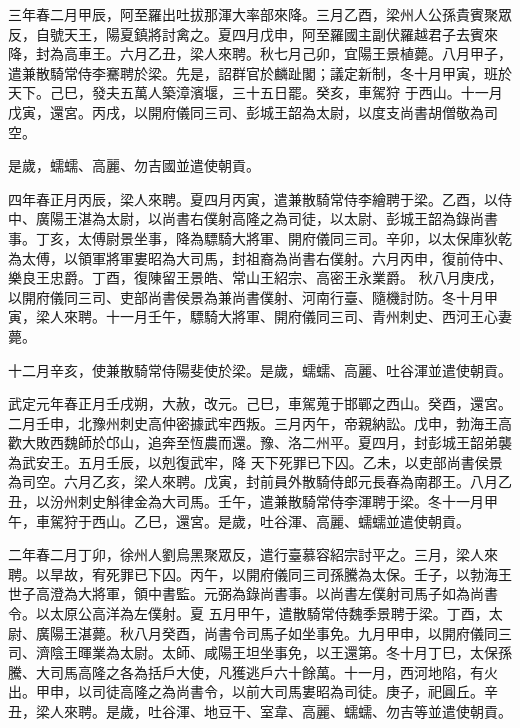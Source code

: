 \begin{pinyinscope}
 三年春二月甲辰，阿至羅出吐拔那渾大率部來降。三月乙酉，梁州人公孫貴賓聚眾反，自號天王，陽夏鎮將討禽之。夏四月戊申，阿至羅國主副伏羅越君子去賓來降，封為高車王。六月乙丑，梁人來聘。秋七月己卯，宜陽王景植薨。八月甲子，遣兼散騎常侍李騫聘於梁。先是，詔群官於麟趾閣；議定新制，冬十月甲寅，班於天下。己巳，發夫五萬人築漳濱堰，三十五日罷。癸亥，車駕狩
 于西山。十一月戊寅，還宮。丙戌，以開府儀同三司、彭城王韶為太尉，以度支尚書胡僧敬為司空。



 是歲，蠕蠕、高麗、勿吉國並遣使朝貢。



 四年春正月丙辰，梁人來聘。夏四月丙寅，遣兼散騎常侍李繪聘于梁。乙酉，以侍中、廣陽王湛為太尉，以尚書右僕射高隆之為司徒，以太尉、彭城王韶為錄尚書事。丁亥，太傅尉景坐事，降為驃騎大將軍、開府儀同三司。辛卯，以太保庫狄乾為太傅，以領軍將軍婁昭為大司馬，封祖裔為尚書右僕射。六月丙申，復前侍中、樂良王忠爵。丁酉，復陳留王景皓、常山王紹宗、高密王永業爵。
 秋八月庚戌，以開府儀同三司、吏部尚書侯景為兼尚書僕射、河南行臺、隨機討防。冬十月甲寅，梁人來聘。十一月壬午，驃騎大將軍、開府儀同三司、青州刺史、西河王心妻薨。



 十二月辛亥，使兼散騎常侍陽斐使於梁。是歲，蠕蠕、高麗、吐谷渾並遣使朝貢。



 武定元年春正月壬戌朔，大赦，改元。己巳，車駕蒐于邯鄲之西山。癸酉，還宮。二月壬申，北豫州刺史高仲密據武牢西叛。三月丙午，帝親納訟。戊申，勃海王高歡大敗西魏師於邙山，追奔至恆農而還。豫、洛二州平。夏四月，封彭城王韶弟襲為武安王。五月壬辰，以剋復武牢，降
 天下死罪已下囚。乙未，以吏部尚書侯景為司空。六月乙亥，梁人來聘。戊寅，封前員外散騎侍郎元長春為南郡王。八月乙丑，以汾州刺史斛律金為大司馬。壬午，遣兼散騎常侍李渾聘于梁。冬十一月甲午，車駕狩于西山。乙巳，還宮。是歲，吐谷渾、高麗、蠕蠕並遣使朝貢。



 二年春二月丁卯，徐州人劉烏黑聚眾反，遣行臺慕容紹宗討平之。三月，梁人來聘。以旱故，宥死罪已下囚。丙午，以開府儀同三司孫騰為太保。壬子，以勃海王世子高澄為大將軍，領中書監。元弼為錄尚書事。以尚書左僕射司馬子如為尚書令。以太原公高洋為左僕射。夏
 五月甲午，遣散騎常侍魏季景聘于梁。丁酉，太尉、廣陽王湛薨。秋八月癸酉，尚書令司馬子如坐事免。九月甲申，以開府儀同三司、濟陰王暉業為太尉。太師、咸陽王坦坐事免，以王還第。冬十月丁巳，太保孫騰、大司馬高隆之各為括戶大使，凡獲逃戶六十餘萬。十一月，西河地陷，有火出。甲申，以司徒高隆之為尚書令，以前大司馬婁昭為司徒。庚子，祀圓丘。辛丑，梁人來聘。是歲，吐谷渾、地豆干、室韋、高麗、蠕蠕、勿吉等並遣使朝貢。




\end{pinyinscope}

